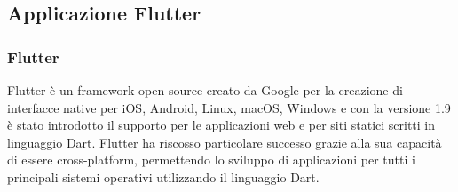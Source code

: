 \subsection{Applicazione Flutter}
\subsubsection{Flutter}
Flutter è un framework open-source creato da Google per la creazione di interfacce native per iOS, Android, Linux, macOS, Windows e con la versione 1.9 è stato introdotto il supporto per le applicazioni web e per siti statici scritti in linguaggio Dart.
Flutter ha riscosso particolare successo grazie alla sua capacità di essere cross-platform, permettendo lo sviluppo di applicazioni per tutti i principali sistemi operativi utilizzando il linguaggio Dart.

